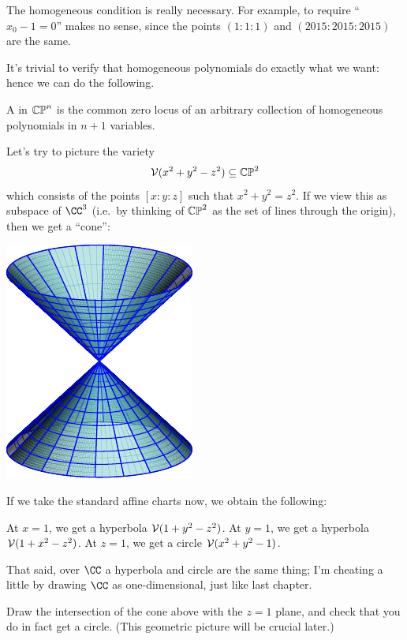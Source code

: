 \documentclass[11pt]{scrreprt}
\begin{document}
The homogeneous condition is really necessary.
For example, to require ``$x_0 - 1 = 0$'' makes no sense,
since the points $(1:1:1)$ and $(2015:2015:2015)$ are the same.

It's trivial to verify that homogeneous polynomials do exactly what we want:
hence we can do the following.
\begin{definition}
	A  in $\mathbb{CP}^n$
	is the common zero locus of an arbitrary
	collection of homogeneous polynomials in $n+1$ variables.
\end{definition}

\begin{example}
	Let's try to picture the variety
	\[ \mathcal V(x^2+y^2-z^2) \subseteq \mathbb{CP}^2 \]
	which consists of the points $[x:y:z]$ such that $x^2+y^2=z^2$.
	If we view this as subspace of $\CC^3$
	(i.e.\ by thinking of $\mathbb{CP}^2$ as the set of lines through the origin),
	then we get a ``cone'':
	\begin{center}
		\includegraphics{media/cone.pdf}
	\end{center}

	If we take the standard affine charts now, we obtain the following:
	\begin{itemize}
		\ii At $x=1$, we get a hyperbola $\mathcal V(1+y^2-z^2)$.
		\ii At $y=1$, we get a hyperbola $\mathcal V(1+x^2-z^2)$.
		\ii At $z=1$, we get a circle $\mathcal V(x^2+y^2-1)$.
	\end{itemize}
	That said, over $\CC$ a hyperbola and circle
	are the same thing; I'm cheating a little by drawing $\CC$
	as one-dimensional, just like last chapter.
\end{example}
\begin{ques}
	Draw the intersection of the cone above
	with the $z=1$ plane, and check that you do in fact get a circle.
	(This geometric picture will be crucial later.)
\end{ques}
\end{document}
